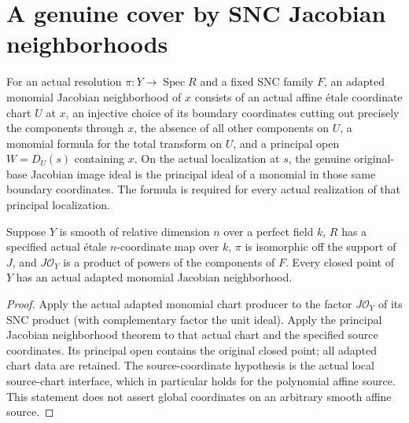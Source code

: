 \section{A genuine cover by SNC Jacobian neighborhoods}

\begin{definition}\label{def:sc0-snc-jacobian-neighbourhood}
\leanok
{}
For an actual resolution $\pi:Y\to\operatorname{Spec}R$ and a fixed SNC family
$F$, an adapted monomial Jacobian neighborhood of $x$ consists of an actual
affine \'etale coordinate chart $U$ at $x$, an injective choice of its boundary
coordinates cutting out precisely the components through $x$, the absence of
all other components on $U$, a monomial formula for the total transform on $U$,
and a principal open $W=D_U(s)$ containing $x$. On the actual localization at
$s$, the genuine original-base Jacobian image ideal is the principal ideal of
a monomial in those same boundary coordinates. The formula is required for
every actual realization of that principal localization.
\end{definition}

\begin{lemma}\label{lem:sc0-snc-jacobian-at-closed}
\leanok
{}
Suppose $Y$ is smooth of relative dimension $n$ over a perfect field $k$,
$R$ has a specified actual \'etale $n$-coordinate map over $k$, $\pi$ is
isomorphic off the support of $J$, and $J\mathcal O_Y$ is a product of powers
of the components of $F$. Every closed point of $Y$ has an actual adapted
monomial Jacobian neighborhood.
\end{lemma}
\begin{proof}
Apply the actual adapted monomial chart producer to the factor
$J\mathcal O_Y$ of its SNC product (with complementary factor the unit ideal).
Apply the principal Jacobian neighborhood theorem to that actual chart and
the specified source coordinates. Its principal open contains the original
closed point; all adapted chart data are retained. The source-coordinate
hypothesis is the actual local source-chart interface, which in particular
holds for the polynomial affine source. This statement does not assert global
coordinates on an arbitrary smooth affine source.
\end{proof}

